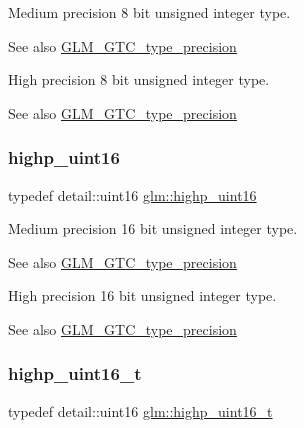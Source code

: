 Medium precision 8 bit unsigned integer type. \begin{DoxySeeAlso}{See also}
\hyperlink{group__gtc__type__precision}{G\+L\+M\+\_\+\+G\+T\+C\+\_\+type\+\_\+precision}
\end{DoxySeeAlso}
High precision 8 bit unsigned integer type. \begin{DoxySeeAlso}{See also}
\hyperlink{group__gtc__type__precision}{G\+L\+M\+\_\+\+G\+T\+C\+\_\+type\+\_\+precision} 
\end{DoxySeeAlso}
\mbox{\label{group__gtc__type__precision_ga4d32967d45ba8365e2a05eaaac85e978}} 
\subsubsection{\texorpdfstring{highp\+\_\+uint16}{highp\_uint16}}
{\footnotesize\ttfamily typedef detail\+::uint16 \hyperlink{group__gtc__type__precision_ga4d32967d45ba8365e2a05eaaac85e978}{glm\+::highp\+\_\+uint16}}

Medium precision 16 bit unsigned integer type. \begin{DoxySeeAlso}{See also}
\hyperlink{group__gtc__type__precision}{G\+L\+M\+\_\+\+G\+T\+C\+\_\+type\+\_\+precision}
\end{DoxySeeAlso}
High precision 16 bit unsigned integer type. \begin{DoxySeeAlso}{See also}
\hyperlink{group__gtc__type__precision}{G\+L\+M\+\_\+\+G\+T\+C\+\_\+type\+\_\+precision} 
\end{DoxySeeAlso}
\mbox{\label{group__gtc__type__precision_ga3145bc0ee80432c165e985a188a722b3}} 
\subsubsection{\texorpdfstring{highp\+\_\+uint16\+\_\+t}{highp\_uint16\_t}}
{\footnotesize\ttfamily typedef detail\+::uint16 \hyperlink{group__gtc__type__precision_ga3145bc0ee80432c165e985a188a722b3}{glm\+::highp\+\_\+uint16\+\_\+t}}

